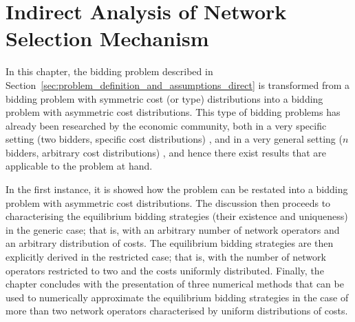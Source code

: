 \chapter{Indirect Analysis of Network Selection Mechanism}
\label{cha:indirect}

In this chapter, the bidding problem described in Section~\ref{sec:problem_definition_and_assumptions_direct} is transformed from a bidding problem with symmetric cost (or type) distributions into a bidding problem with asymmetric cost distributions. This type of bidding problems has already been researched by the economic community, both in a very specific setting (two bidders, specific cost distributions) \cite{KaplanZamir2007,MaskinRiley2000}, and in a very general setting ($n$ bidders, arbitrary cost distributions) \cite{Lebrun1999,Lebrun2006}, and hence there exist results that are applicable to the problem at hand.

In the first instance, it is showed how the problem can be restated into a bidding problem with asymmetric cost distributions. The discussion then proceeds to characterising the equilibrium bidding strategies (their existence and uniqueness) in the generic case; that is, with an arbitrary number of network operators and an arbitrary distribution of costs. The equilibrium bidding strategies are then explicitly derived in the restricted case; that is, with the number of network operators restricted to two and the costs uniformly distributed. Finally, the chapter concludes with the presentation of three numerical methods that can be used to numerically approximate the equilibrium bidding strategies in the case of more than two network operators characterised by uniform distributions of costs.

